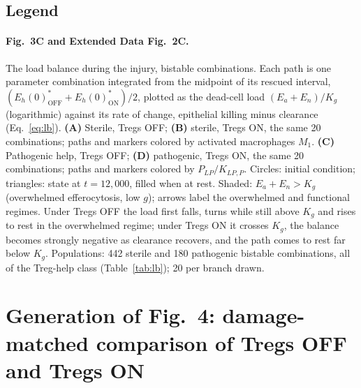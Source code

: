 \documentclass[11pt]{article}
\begin{document}
\subsection{Legend}

\paragraph{Fig.~3C and Extended Data Fig.~2C.}
The load balance during the injury, bistable combinations. Each path is one parameter
combination integrated from the midpoint of its rescued interval,
$(E_h(0)^*_{\mathrm{OFF}}+E_h(0)^*_{\mathrm{ON}})/2$, plotted as the dead-cell load
$(E_a+E_n)/K_g$ (logarithmic) against its rate of change, epithelial killing minus clearance
(Eq.~\ref{eq:lb}). \textbf{(A)} Sterile, Tregs OFF; \textbf{(B)} sterile, Tregs ON, the same 20
combinations; paths and markers colored by activated macrophages $M_1$. \textbf{(C)} Pathogenic
help, Tregs OFF; \textbf{(D)} pathogenic, Tregs ON, the same 20 combinations; paths and
markers colored by $P_{LP}/K_{LP,P}$. Circles: initial condition; triangles: state at
$t=12{,}000$, filled when at rest. Shaded: $E_a+E_n > K_g$ (overwhelmed efferocytosis, low $g$);
arrows label the overwhelmed and functional regimes. Under Tregs OFF the load first falls,
turns while still above $K_g$ and rises to rest in the overwhelmed regime; under Tregs ON it
crosses $K_g$, the balance becomes strongly negative as clearance recovers, and the path comes to
rest far below $K_g$. Populations: 442 sterile and 180 pathogenic bistable combinations, all of the Treg-help class
(Table~\ref{tab:lb}); 20 per branch drawn.

\section{Generation of Fig.~4: damage-matched comparison of Tregs OFF and Tregs ON}
\label{sec:fig6}
\end{document}

